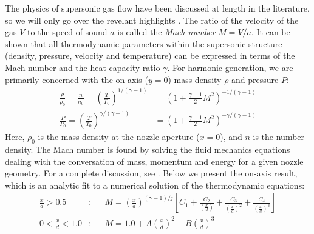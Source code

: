 The physics of supersonic gas flow have been discussed at length in the literature, so we will only go over the revelant highlights \cite{millerFreeJetSources1988}. The ratio of the velocity of the gas $V$ to the speed of sound $a$ is called the \textit{Mach number} $M=V/a$. It can be shown that all thermodynamic parameters within the supersonic structure (density, pressure, velocity and temperature) can be expressed in terms of the Mach number and the heat capacity ratio $\gamma$. For harmonic generation, we are primarily concerned with the on-axis ($y=0$) mass density $\rho$ and pressure $P$:
\begin{subequations}
	\label{eqn:mach_properties}
	\begin{align}
	\frac{\rho}{\rho_0} = \frac{n}{n_0} = \left(\frac{T}{T_0}\right)^{1/(\gamma-1)} &= \left(  1 + \frac{\gamma-1}{2} M^2 \right)^{-1/(\gamma-1)} \label{eqn:mach_rho} \\
	\frac{P}{P_0} = \left(\frac{T}{T_0}\right)^{\gamma/(\gamma-1)} &= \left(  1 + \frac{\gamma-1}{2} M^2 \right)^{-\gamma/(\gamma-1)} \label{eqn:mach_pressure}
	\end{align}
\end{subequations}
Here, $\rho_0$ is the mass density at the nozzle aperture ($x=0$), and $n$ is the number density. The Mach number is found by solving the fluid mechanics equations dealing with the conversation of mass, momentum and energy for a given nozzle geometry. For a complete discussion, see \cite{millerFreeJetSources1988}. Below we present the on-axis result, which is an analytic fit to a numerical solution of the thermodynamic equations:
\begin{subequations}
	\label{eqn:Scoles_centerline2.2}
	\begin{align}
	\frac{x}{d} > 0.5&: &&M = \left( \frac{x}{d} \right)^{(\gamma-1)/j} \left[ C_1 + \frac{C_2}{\left(\frac{x}{d}\right)} + \frac{C_3}{\left(\frac{x}{d}\right)^2} + \frac{C_4}{\left(\frac{x}{d}\right)^3} \right] \label{eqn:Scoles_centerline1} \\
	0 < \frac{x}{d} < 1.0&: &&M = 1.0 + A \left( \frac{x}{d} \right)^2 + B \left( \frac{x}{d} \right)^3 \label{eqn:Scoles_centerline2}
	\end{align}
\end{subequations}
